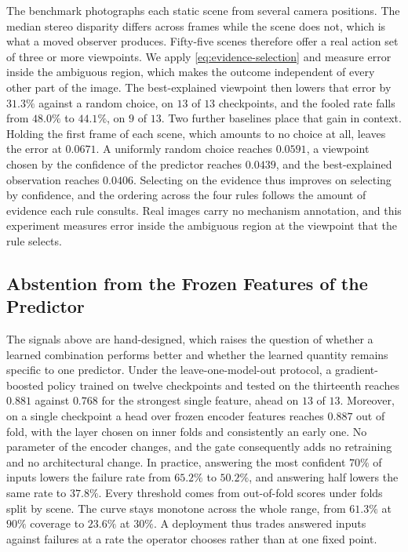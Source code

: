 \documentclass{article} %
\theoremstyle{defstyle}
\theoremstyle{plain}
\begin{document}
The benchmark photographs each static scene from several camera positions. The median stereo
disparity differs across frames while the scene does not, which is what a moved observer
produces. Fifty-five scenes therefore offer a real action set of three or more viewpoints. We
apply \eqref{eq:evidence-selection} and measure error inside the ambiguous region, which makes
the outcome independent of every other part of the image. The best-explained viewpoint then
lowers that error by $31.3\%$ against a random choice, on $13$ of $13$
checkpoints, and the fooled rate falls from $48.0\%$ to $44.1\%$, on $9$ of $13$. Two further
baselines place that gain in context. Holding the first frame of each scene, which amounts to
no choice at all, leaves the error at $0.0671$. A uniformly random choice reaches $0.0591$, a
viewpoint chosen by the confidence of the predictor reaches $0.0439$, and the best-explained
observation reaches $0.0406$. Selecting on the evidence thus improves on selecting by
confidence, and the ordering across the four rules follows the amount of evidence each rule
consults. Real images carry no mechanism annotation, and this experiment measures error inside
the ambiguous region at the viewpoint that the rule selects.

\subsection{Abstention from the Frozen Features of the Predictor}
\label{sec:res-learned}

The signals above are hand-designed, which raises the question of whether a learned combination
performs better and whether the learned quantity remains specific to one predictor. Under the
leave-one-model-out protocol, a gradient-boosted policy trained on twelve checkpoints and
tested on the thirteenth reaches $0.881$ against $0.768$ for the strongest single
feature, ahead on $13$ of $13$. Moreover, on a single checkpoint a head over
frozen encoder features reaches $0.887$ out of fold, with the layer chosen on
inner folds and consistently an early one. No parameter of the encoder changes, and the gate
consequently adds no retraining and no architectural change. In practice, answering the most
confident $70\%$ of inputs lowers the failure rate from $65.2\%$ to $50.2\%$, and answering
half lowers the same rate to $37.8\%$. Every threshold comes from out-of-fold scores under
folds split by scene. The curve stays monotone across the whole range, from $61.3\%$ at $90\%$
coverage to $23.6\%$ at $30\%$. A deployment thus trades answered inputs against failures at a
rate the operator chooses rather than at one fixed point.
\end{document}
